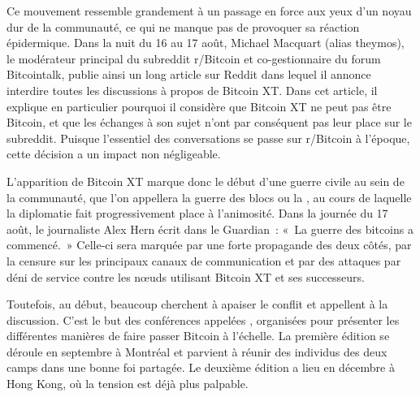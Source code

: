 Ce mouvement ressemble grandement à un passage en force aux yeux d'un noyau dur de la communauté, ce qui ne manque pas de provoquer sa réaction épidermique. Dans la nuit du 16 au 17 août, Michael Macquart (alias theymos), le modérateur principal du subreddit r/Bitcoin et co-gestionnaire du forum Bitcointalk, publie ainsi un long article sur Reddit dans lequel il annonce interdire toutes les discussions à propos de Bitcoin XT. Dans cet article, il explique en particulier pourquoi il considère que Bitcoin XT ne peut pas être Bitcoin, et que les échanges à son sujet n'ont par conséquent pas leur place sur le subreddit. Puisque l'essentiel des conversations se passe sur r/Bitcoin à l'époque, cette décision a un impact non négligeable.

L'apparition de Bitcoin XT marque donc le début d'une guerre civile au sein de la communauté, que l'on appellera la guerre des blocs ou la , au cours de laquelle la diplomatie fait progressivement place à l'animosité. Dans la journée du 17 août, le journaliste Alex Hern écrit dans le Guardian~: «~La guerre des bitcoins a commencé.~» Celle-ci sera marquée par une forte propagande des deux côtés, par la censure sur les principaux canaux de communication et par des attaques par déni de service contre les nœuds utilisant Bitcoin XT et ses successeurs.

Toutefois, au début, beaucoup cherchent à apaiser le conflit et appellent à la discussion. C'est le but des conférences appelées , organisées pour présenter les différentes manières de faire passer Bitcoin à l'échelle. La première édition se déroule en septembre à Montréal et parvient à réunir des individus des deux camps dans une bonne foi partagée. Le deuxième édition a lieu en décembre à Hong Kong, où la tension est déjà plus palpable.

